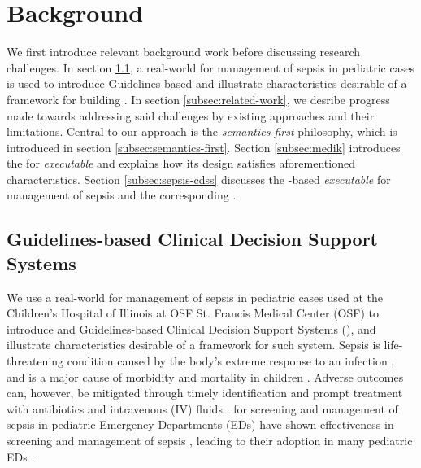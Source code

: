 \section{Background}


We first introduce relevant background work before discussing research challenges.
In section \ref{subsec:cdss}, a real-world \BPG{} for management of sepsis
in pediatric cases is used to introduce Guidelines-based \CDSSs{} and illustrate
characteristics desirable of a framework for building \CDSSs{}.
In section \ref{subsec:related-work}, we desribe progress
made towards addressing said challenges by existing approaches and their limitations.
Central to our approach is the \emph{semantics-first} philosophy,
which is introduced in section \ref{subsec:semantics-first}.
Section \ref{subsec:medik} introduces the \MediK{} \DSL{} for
\emph{executable} \BPGs{} and explains how its design satisfies aforementioned
characteristics. Section \ref{subsec:sepsis-cdss} discusses the \MediK{}-based
\emph{executable} \BPG{} for management of sepsis and the corresponding \CDSS{}.

\subsection{Guidelines-based Clinical Decision Support Systems}\label{subsec:cdss}

We use a real-world \BPG{} for management of sepsis
in pediatric cases used at the Children's Hospital of Illinois at OSF St.
Francis Medical Center (OSF) to introduce \BPGs{} and Guidelines-based Clinical Decision
Support Systems (\CDSSs{}), and illustrate characteristics desirable of a framework for such system.
Sepsis is life-threatening condition caused by the body's extreme response to
an infection \cite{RhodesICM17}, and is
a major cause of morbidity and mortality in children \cite{Eisenberg2021JP}.
Adverse outcomes can, however, be mitigated through timely
identification and prompt treatment with antibiotics and
intravenous (IV) fluids \cite{Weiss2014CCM,Evans2018JAMA}.
\BPGs{} for screening and management of sepsis in pediatric Emergency
Departments (EDs) have shown effectiveness in screening and management of sepsis \cite{Eisenberg2021JP},
leading to their adoption in many pediatric EDs \cite{Balamuth2017EM,Sepanski2014FP}.

